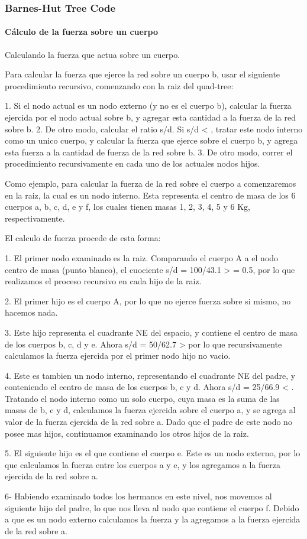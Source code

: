 \frame
{
\frametitle{Barnes-Hut Tree Code}
\framesubtitle{Cálculo de la fuerza sobre un cuerpo}

Calculando la fuerza que actua sobre un cuerpo.

Para calcular la fuerza que ejerce la red sobre un cuerpo b,
usar el siguiente procedimiento recursivo, comenzando con
la raiz del quad-tree:

1. Si el nodo actual es un nodo externo (y no es el cuerpo b),
   calcular la fuerza ejercida por el nodo actual sobre b,
   y agregar esta cantidad a la fuerza de la red sobre b.
2. De otro modo, calcular el ratio s/d. Si s/d < \theta,
   tratar este nodo interno como un unico cuerpo, y calcular
   la fuerza que ejerce sobre el cuerpo b, y agrega esta fuerza
   a la cantidad de fuerza de la red sobre b.
3. De otro modo, correr el procedimiento recursivamente en cada
   uno de los actuales nodos hijos.

Como ejemplo, para calcular la fuerza de la red sobre el cuerpo a
comenzaremos en la raiz, la cual es un nodo interno.
Esta representa el centro de masa de los 6 cuerpos
a, b, c, d, e y f, los cuales tienen masas 1, 2, 3, 4, 5 y 6 Kg,
respectivamente.

El calculo de fuerza procede de esta forma:

1. El primer nodo examinado es la raiz. Comparando el cuerpo A
   a el nodo centro de masa (punto blanco), el cuociente
   s/d = 100/43.1 > \theta = 0.5, por lo que realizamos el proceso
   recursivo en cada hijo de la raiz.

2. El primer hijo es el cuerpo A, por lo que no ejerce fuerza sobre
   si mismo, no hacemos nada.

3. Este hijo representa el cuadrante NE del espacio, y contiene
   el centro de masa de los cuerpos b, c, d y e.
   Ahora s/d = 50/62.7 > \theta por lo que recursivamente
   calculamos la fuerza ejercida por el primer nodo hijo no vacio.

4. Este es tambien un nodo interno, representando el cuadrante
   NE del padre, y conteniendo el centro de masa de los cuerpos
   b, c y d.
   Ahora s/d = 25/66.9 < \theta.
   Tratando el nodo interno como un solo cuerpo, cuya masa
   es la suma de las masas de b, c y d, calculamos la fuerza
   ejercida sobre el cuerpo a, y se agrega al valor
   de la fuerza ejercida de la red sobre a.
   Dado que el padre de este nodo no posee mas hijos,
   continuamos examinando los otros hijos de la raiz.

5. El siguiente hijo es el que contiene el cuerpo e.
   Este es un nodo externo, por lo que calculamos la fuerza
   entre los cuerpos a y e, y los agregamos a la fuerza
   ejercida de la red sobre a.

6- Habiendo examinado todos los hermanos en este nivel,
   nos movemos al siguiente hijo del padre, lo que nos lleva
   al nodo que contiene el cuerpo f.
   Debido a que es un nodo externo calculamos la fuerza
   y la agregamos a la fuerza ejercida de la red sobre a.
}


